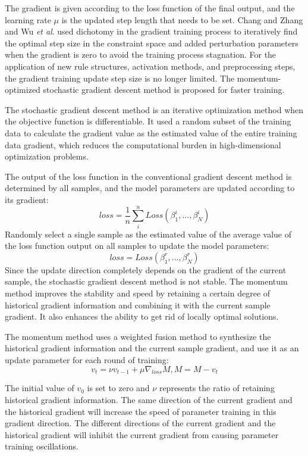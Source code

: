 \documentclass{ieeeaccess}
\begin{document}
The gradient is given according to the loss function of the final output,
and the learning rate $\mu$ is the updated step length that needs to be set.
Chang and Zhang\cite{a11} and Wu \textit{et al}.\cite{a13} used dichotomy in the gradient training process to iteratively find the optimal step size in the constraint space and
added perturbation parameters when the gradient is zero to avoid the training process stagnation.
For the application of new rule structures, activation methods, and preprocessing steps, the gradient training update step size is no longer limited.
The momentum-optimized stochastic gradient descent method is proposed for faster training.

The stochastic gradient descent method is an iterative optimization method when the objective function is differentiable.
It used a random subset of the training data to calculate the gradient value as the estimated value of the entire training data gradient,
which reduces the computational burden in high-dimensional optimization problems.

The output of the loss function in the conventional gradient descent method is determined by all samples,
and the model parameters are updated according to its gradient:
\begin{equation}
    loss=\frac{1}{n}\sum_i^nLoss(\beta_1^i,...,\beta_N^i)
\end{equation}
Randomly select a single sample as the estimated value of the average value of the loss function output on all samples to update the model parameters:
\begin{equation}
    loss=Loss(\beta_1^r,...,\beta_N^r)
\end{equation}
Since the update direction completely depends on the gradient of the current sample, the stochastic gradient descent method is not stable.
The momentum method improves the stability and speed by retaining a certain degree of historical gradient information and combining it with the current sample gradient.
It also enhances the ability to get rid of locally optimal solutions.

The momentum method uses a weighted fusion method to synthesize the historical gradient information and the current sample gradient,
and use it as an update parameter for each round of training:
\begin{equation}
    v_t=\nu v_{t-1}+\mu\nabla_{loss}M,M=M-v_t
\end{equation}

The initial value of $v_0$ is set to zero and $\nu$ represents the ratio of retaining historical gradient information.
The same direction of the current gradient and the historical gradient will increase the speed of parameter training in this gradient direction.
The different directions of the current gradient and the historical gradient will inhibit the current gradient from causing parameter training oscillations.
\end{document}
